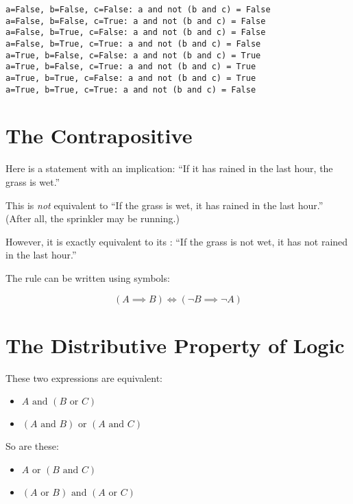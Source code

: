 \begin{verbatim}
a=False, b=False, c=False: a and not (b and c) = False
a=False, b=False, c=True: a and not (b and c) = False
a=False, b=True, c=False: a and not (b and c) = False
a=False, b=True, c=True: a and not (b and c) = False
a=True, b=False, c=False: a and not (b and c) = True
a=True, b=False, c=True: a and not (b and c) = True
a=True, b=True, c=False: a and not (b and c) = True
a=True, b=True, c=True: a and not (b and c) = False
\end{verbatim}

\section{The Contrapositive}

Here is a statement with an implication: ``If it has rained in the last hour, the grass is wet.''

This is \textit{not} equivalent to ``If the grass is wet, it has
rained in the last hour.'' (After all, the sprinkler may be running.)

However, it is exactly equivalent to its :
``If the grass is not wet, it has not rained in the last hour.''

The rule can be written using symbols:

$$\left( A \implies B \right) \iff \left( \neg B \implies \neg A \right)$$

\section{The Distributive Property of Logic}

These two expressions are equivalent:
\begin{itemize}
  \item $A \text{ and } \left(B \text{ or } C \right)$
  \item $\left(A \text{ and } B \right) \text{ or } \left( A \text{ and } C \right)$
\end{itemize}

So are these:

\begin{itemize}
  \item $A \text{ or } \left(B \text{ and } C \right)$
  \item $\left(A \text{ or } B \right) \text{ and } \left( A \text{ or } C \right)$
\end{itemize}


